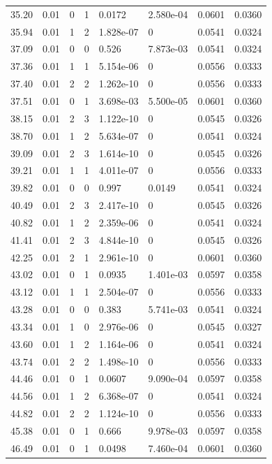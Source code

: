 \documentclass[preview]{standalone}
\begin{document}
{{{\begin{tabular}{L{1.2cm}C{1.2cm} C{0.3cm}C{0.5cm} C{1.4cm}C{1.4cm} C{1.4cm}C{1.4cm}}
  35.20  &  0.01  & 0     &  1 &  0.0172  & 2.580e-04  & 0.0601 &  0.0360   \\ 
  35.94  &  0.01  & 1     &  2 &  1.828e-07  & 0  & 0.0541 &  0.0324   \\ 
  37.09  &  0.01  & 0     &  0 &  0.526  & 7.873e-03  & 0.0541 &  0.0324   \\ 
  37.36  &  0.01  & 1     &  1 &  5.154e-06  & 0  & 0.0556 &  0.0333   \\ 
  37.40  &  0.01  & 2     &  2 &  1.262e-10  & 0  & 0.0556 &  0.0333   \\ 
  37.51  &  0.01  & 0     &  1 &  3.698e-03  & 5.500e-05  & 0.0601 &  0.0360   \\ 
  38.15  &  0.01  & 2     &  3 &  1.122e-10  & 0  & 0.0545 &  0.0326   \\ 
  38.70  &  0.01  & 1     &  2 &  5.634e-07  & 0  & 0.0541 &  0.0324   \\ 
  39.09  &  0.01  & 2     &  3 &  1.614e-10  & 0  & 0.0545 &  0.0326   \\ 
  39.21  &  0.01  & 1     &  1 &  4.011e-07  & 0  & 0.0556 &  0.0333   \\ 
  39.82  &  0.01  & 0     &  0 &  0.997  & 0.0149  & 0.0541 &  0.0324   \\ 
  40.49  &  0.01  & 2     &  3 &  2.417e-10  & 0  & 0.0545 &  0.0326   \\ 
  40.82  &  0.01  & 1     &  2 &  2.359e-06  & 0  & 0.0541 &  0.0324   \\ 
  41.41  &  0.01  & 2     &  3 &  4.844e-10  & 0  & 0.0545 &  0.0326   \\ 
  42.25  &  0.01  & 2     &  1 &  2.961e-10  & 0  & 0.0601 &  0.0360   \\ 
  43.02  &  0.01  & 0     &  1 &  0.0935  & 1.401e-03  & 0.0597 &  0.0358   \\ 
  43.12  &  0.01  & 1     &  1 &  2.504e-07  & 0  & 0.0556 &  0.0333   \\ 
  43.28  &  0.01  & 0     &  0 &  0.383  & 5.741e-03  & 0.0541 &  0.0324   \\ 
  43.34  &  0.01  & 1     &  0 &  2.976e-06  & 0  & 0.0545 &  0.0327   \\ 
  43.60  &  0.01  & 1     &  2 &  1.164e-06  & 0  & 0.0541 &  0.0324   \\ 
  43.74  &  0.01  & 2     &  2 &  1.498e-10  & 0  & 0.0556 &  0.0333   \\ 
  44.46  &  0.01  & 0     &  1 &  0.0607  & 9.090e-04  & 0.0597 &  0.0358   \\ 
  44.56  &  0.01  & 1     &  2 &  6.368e-07  & 0  & 0.0541 &  0.0324   \\ 
  44.82  &  0.01  & 2     &  2 &  1.124e-10  & 0  & 0.0556 &  0.0333   \\ 
  45.38  &  0.01  & 0     &  1 &  0.666  & 9.978e-03  & 0.0597 &  0.0358   \\ 
  46.49  &  0.01  & 0     &  1 &  0.0498  & 7.460e-04  & 0.0601 &  0.0360   \\ 
\hline 
\end{tabular} 

}}}
\end{document}
